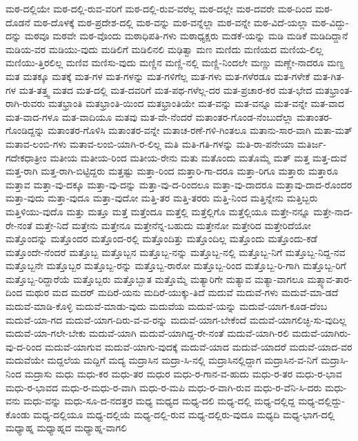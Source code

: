 {ಮಠ-ದಲ್ಲಿಯೇ
ಮಠ-ದಲ್ಲಿ-ರುವ-ವರಿಗೆ
ಮಠ-ದಲ್ಲಿ-ರುವ-ವರೆಲ್ಲ
ಮಠ-ದಲ್ಲೇ
ಮಠ-ದವರೇ
ಮಠ-ದಿಂದ
ಮಠ-ದೊಡನೆ
ಮಠ-ದೊಳಕ್ಕೆ
ಮಠ-ಪ್ರದೇಶ-ದಲ್ಲಿ
ಮಠ-ವನ್ನು
ಮಠ-ವನ್ನೆಲ್ಲಾ
ಮಠ-ವನ್ನೇ
ಮಠ-ವಿದೆ-ಯಲ್ಲಾ
ಮಠ-ವಿದ್ದು-ದನ್ನು
ಮಠವೂ
ಮಠವೇ
ಮಠ-ವೊಂದು
ಮಠಾಧಿಪತಿ-ಗಳು
ಮಠಾಧ್ಯಕ್ಷರು
ಮಡಕೆ-ಯನ್ನು
ಮಡಿ
ಮಡಿಕೆ
ಮಡಿದಿದ್ದಾನೆ
ಮಡಿಯ-ವರ
ಮಡಿಯು-ವುದು
ಮಡಿಲಿಗೆ
ಮಡಿಲಿನಲಿ
ಮಢಿತ್ವಾ
ಮಣ
ಮಣಿದು
ಮಣಿಯದ
ಮಣಿಯ-ಲಿಲ್ಲ
ಮಣಿಯು-ತ್ತಿರಲಿಲ್ಲ
ಮಣಿವ
ಮಣಿಸು-ವುದು
ಮಣ್ಣಿನ
ಮಣ್ಣಿ-ನಲ್ಲಿ
ಮಣ್ಣಿ-ನಿಂದಲೇ
ಮಣ್ಣು
ಮಣ್ಣೇ-ನಾದರೂ
ಮಣ್ದ
ಮತ
ಮತಕ್ಕೂ
ಮತಕ್ಕೆ
ಮತ-ಗಳ
ಮತ-ಗಳನ್ನು
ಮತ-ಗಳಿಗೆಲ್ಲ
ಮತ-ಗಳು
ಮತ-ಗಳೆರಡೂ
ಮತ-ಗಳೇಕೆ
ಮತ-ಗಿತ-ಗಳ
ಮತ-ತತ್ತ್ವ
ಮತದ
ಮತ-ದಲ್ಲಿ
ಮತ-ದವರಿಗೆ
ಮತ-ಪಥ-ಗಳೆಲ್ಲ-ದರ
ಮತ-ಪ್ರಚಾರ-ಕರ
ಮತ-ಭೇದ
ಮತಭ್ರಾಂತ-ರಾಗಿ-ರುವರು
ಮತಭ್ರಾಂತಿ
ಮತಭ್ರಾಂತಿ-ಯಿಂದ
ಮತಭ್ರಾಂತಿಯೇ
ಮತ-ವನ್ನು
ಮತ-ವನ್ನೂ
ಮತ-ವನ್ನೇ
ಮತ-ವಾದ
ಮತ-ವಾದ-ಗಳೂ
ಮತ-ವಾದಿಯೂ
ಮತವು
ಮತ-ವೇ-ನೆಂದರೆ
ಮತಾಂತರ-ಗೊಂಡ-ನೆಂಬುದೆಲ್ಲಾ
ಮತಾಂತರ-ಗೊಂಡಿದ್ದನ್ನು
ಮತಾಂತರ-ಗೊಳಿಸಿ
ಮತಾಂತರ-ವನ್ನೇ
ಮತಾಚ-ರಣೆ-ಗಳಿ-ಗಿಂತಲೂ
ಮತಾನು-ಸಾರ-ವಾಗಿ
ಮತಾ-ಮತ್
ಮತಾವ-ಲಂಬಿ-ಗಳು
ಮತಾವ-ಲಂಬಿ-ಯಾಗಿ-ರ-ಲಿಲ್ಲ
ಮತಿ
ಮತಿ-ಗತಿ-ಗಳನ್ನು
ಮತಿ-ರಾ-ಪನೇಯಾ
ಮತಿರ್ಜ-ಗದೇಕಧಾತ್ರೀಂ
ಮತೀಯ
ಮತೀಯ-ರಿಂದ
ಮತೀಯ-ರೇನು
ಮತು
ಮತೊಂದು
ಮತೊಮ್ಮೆ
ಮತ್
ಮತ್ತ
ಮತ್ತ-ದುವೆ
ಮತ್ತ-ರಾಗಿ
ಮತ್ತ-ರಾಗಿ-ಬಿಟ್ಟಿದ್ದರು
ಮತ್ತಷ್ಟು
ಮತ್ತಾ-ರಿಂದ
ಮತ್ತಾರಿ-ಗಾ-ದರೂ
ಮತ್ತಾ-ರಿಗೂ
ಮತ್ತಾರು
ಮತ್ತಾರೂ
ಮತ್ತಾವ
ಮತ್ತಾ-ವು-ದಕ್ಕೂ
ಮತ್ತಾ-ವು-ದನ್ನು
ಮತ್ತಾ-ವು-ದ-ರಿಂದಲೂ
ಮತ್ತಾ-ವು-ದಾದರೂ
ಮತ್ತಾವು-ದಾದ-ರೊಂದರ
ಮತ್ತಾ-ವುದು
ಮತ್ತಾ-ವುದೂ
ಮತ್ತಾ-ವುದೋ
ಮತ್ತಿ-ತರ
ಮತ್ತಿ-ತರರು
ಮತ್ತಿ-ನಿಂದ
ಮತ್ತಿನ್ನೇನು
ಮತ್ತಿಬ್ಬರು
ಮತ್ತಿಳಿಯು-ವುದೊ
ಮತ್ತು
ಮತ್ತೂ
ಮತ್ತೆ
ಮತ್ತೆಂದೂ
ಮತ್ತೆಲ್ಲಿ
ಮತ್ತೆಲ್ಲಿಗೊ
ಮತ್ತೆಲ್ಲಿಯೂ
ಮತ್ತೇ-ನನ್ನೂ
ಮತ್ತೇ-ನಾದ-ರೇ-ನಂತೆ
ಮತ್ತೇ-ನಿದೆ
ಮತ್ತೇನು
ಮತ್ತೇನೂ
ಮತ್ತೇನೆನ್ನ-ಬಹುದು
ಮತ್ತೇನೋ
ಮತ್ತೇರಿದ
ಮತ್ತೇರಿದೆಯೋ
ಮತ್ತೊಂದನ್ನು
ಮತ್ತೊಂದರ
ಮತ್ತೊಂದ-ರಲ್ಲಿ
ಮತ್ತೊಂದಿತ್ತು
ಮತ್ತೊಂದಿಲ್ಲ
ಮತ್ತೊಂದು
ಮತ್ತೊಂದು-ಕಡೆ
ಮತ್ತೊಂದೇ-ನೆಂದರೆ
ಮತ್ತೊಬ್ಬ
ಮತ್ತೊಬ್ಬನ
ಮತ್ತೊಬ್ಬ-ನನ್ನು
ಮತ್ತೊಬ್ಬ-ನಲ್ಲಿ
ಮತ್ತೊಬ್ಬ-ನಿಗೆ
ಮತ್ತೊಬ್ಬ-ನಿದ್ದ-ನವ
ಮತ್ತೊಬ್ಬನೇ
ಮತ್ತೊಬ್ಬರ
ಮತ್ತೊಬ್ಬ-ರನ್ನು
ಮತ್ತೊಬ್ಬ-ರಾರೋ
ಮತ್ತೊಬ್ಬ-ರಿಂದ
ಮತ್ತೊಬ್ಬ-ರಿ-ಗಾಗಿ
ಮತ್ತೊಬ್ಬ-ರಿಗೆ
ಮತ್ತೊಬ್ಬ-ರಿದ್ದಾರೆಯೆ
ಮತ್ತೊಬ್ಬರು
ಮತ್ತೊಬ್ಬಾತ
ಮತ್ತೊಮ್ಮೆ
ಮತ್ಯಾರಿಗೇ
ಮತ್ಯಾವ
ಮತ್ಯಾ-ವಾಗಲೂ
ಮತ್ಸ್ಯಾವ-ತಾರ-ದಿಂದ
ಮಥುರ
ಮದ
ಮದರ್
ಮದಿರೆ-ಯನು
ಮದಿರೆ-ಯುಕ್ಕು-ತಿದೆ
ಮದುವೆ
ಮದುವೆ-ಗಳು
ಮದುವೆ-ಮಾ-ಡದೆ
ಮದುವೆ-ಮಾಡಿ-ಕೊಳ್ಳಿ
ಮದುವೆ-ಮಾಡು-ವುದು
ಮದುವೆಯ
ಮದುವೆ-ಯನ್ನು
ಮದುವೆ-ಯಾಗ-ಕೂಡ-ದೆಂಬ
ಮದುವೆ-ಯಾ-ಗದ
ಮದುವೆ-ಯಾಗ-ದಿರು-ವ-ವ-ರನ್ನು
ಮದುವೆ-ಯಾಗ-ಬೇಕೆಂದೆ
ಮದುವೆ-ಯಾಗಲಿಚ್ಛಿ-ಸು-ವುದಿಲ್ಲ
ಮದುವೆ-ಯಾ-ಗಲೇ-ಬೇಕು
ಮದುವೆ-ಯಾಗಿ
ಮದುವೆ-ಯಾಗಿದ್ದ-ರೇ-ನಂತೆ
ಮದುವೆ-ಯಾಗಿ-ರಲಿ
ಮದುವೆ-ಯಾಗಿರು-ವು-ದ-ರಿಂದ
ಮದುವೆ-ಯಾಗುವ
ಮದುವೆ-ಯಾಗು-ವುದಕ್ಕೆ
ಮದುವೆ-ಯಾದ
ಮದುವೆ-ಯಾದರೆ
ಮದುವೆ-ಯಾದ-ವರ
ಮದುವೆಯೇ
ಮದ್ದಲೆಯ
ಮದ್ದಿಗೆ
ಮದ್ಯ
ಮದ್ರಾಸಿನ
ಮದ್ರಾ-ಸಿ-ನಲ್ಲಿ
ಮದ್ರಾಸಿನಲ್ಲಿದ್ದಾಗ
ಮದ್ರಾಸಿನ-ವ-ನಿಗೆ
ಮದ್ರಾಸಿ-ನಿಂದ
ಮದ್ರಾಸು
ಮಧು
ಮಧು-ಕರ
ಮಧು-ತರ
ಮಧುರ
ಮಧು-ರ-ಗಾನ-ವ-ಹುದು
ಮಧು-ರ-ತರ
ಮಧು-ರ-ಭಾವ
ಮಧು-ರ-ಭಾವದ
ಮಧು-ರ-ಮಧು-ರ-ವಾಗಿ
ಮಧು-ರ-ಮಪಿ
ಮಧು-ರ-ವಾಗಿ-ರುವ
ಮಧು-ರ-ವೆನಿ-ಸಿ-ದರು
ಮಧು-ವನು
ಮಧು-ವನ್ನು
ಮಧು-ಸೂ-ದ-ನದತ್ತರ
ಮಧ್ಯ
ಮಧ್ಯದ
ಮಧ್ಯ-ದಲಿ
ಮಧ್ಯ-ದಲ್ಲಿ
ಮಧ್ಯ-ದಲ್ಲಿದ್ದ
ಮಧ್ಯ-ದಲ್ಲಿದ್ದು-ಕೊಂಡು
ಮಧ್ಯ-ದಲ್ಲಿಯೂ
ಮಧ್ಯ-ದಲ್ಲಿಯೆ
ಮಧ್ಯ-ದಲ್ಲಿ-ರುವ
ಮಧ್ಯ-ದಲ್ಲಿರು-ವುದೂ
ಮಧ್ಯದಿ
ಮಧ್ಯ-ಭಾಗ-ದಲ್ಲಿ
ಮಧ್ಯಾಹ್ನ
ಮಧ್ಯಾಹ್ನದ
ಮಧ್ಯಾಹ್ನ-ವಾಗಲಿ
}
